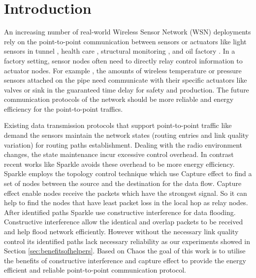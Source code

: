 \documentclass[conference]{IEEEtran}
\begin{document}
\section{Introduction}
An increasing number of real-world Wireless Sensor Network (WSN) deployments rely on the point-to-point communication between sensors or actuators like light sensors in tunnel \cite{ceriotti2011there}, health care \cite{shnayder2005sensor}, structural monitoring \cite{hackmann2008holistic}, and oil factory \cite{suriyachai2010time}. In a factory setting, sensor nodes often need to directly relay control information to actuator nodes. For example \cite{suriyachai2010time}, the amounts of wireless temperature or pressure sensors attached on the pipe need communicate with their specific actuators like valves or sink in the guaranteed time delay for safety and production. The future communication protocols of the network should be more reliable and energy efficiency for the point-to-point traffics. %

Existing data transmission protocols that support point-to-point traffic like \cite{ortiz2007beacon} \cite{liang2008koala} \cite{winter2012rpl} demand the sensors maintain the network states (routing entries and link quality variation) for routing paths establishment. Dealing with the radio environment changes, the state maintenance incur excessive control overhead. In contrast recent works like Sparkle \cite{yuan2014making} avoids these overhead to be more energy efficiency. Sparkle employs the topology control technique which use Capture effect to find a set of nodes between the source and the destination for the data flow. Capture effect enable nodes receive the packets which have the strongest signal. So it can help to find the nodes that have least packet loss in the local hop as relay nodes. After identified paths Sparkle use constructive interference \cite{ferrari2011efficient} for data flooding. Constructive interference allow the identical and overlap packets to be received and help flood network efficiently. However without the necessary link quality control its identified paths lack necessary reliability as our experiments showed in Section \ref{sec:benefitsofhelpers}. Based on Chaos \cite{landsiedel2013chaos} the goal of this work is to utilise the benefits of constructive interference and capture effect to provide the energy efficient and reliable point-to-point communication protocol. 
\end{document}

